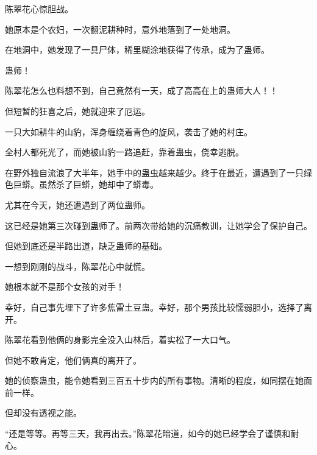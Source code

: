 \begin{this_body}
陈翠花心惊胆战。

她原本是个农妇，一次翻泥耕种时，意外地落到了一处地洞。

在地洞中，她发现了一具尸体，稀里糊涂地获得了传承，成为了蛊师。

蛊师！

陈翠花怎么也料想不到，自己竟然有一天，成了高高在上的蛊师大人！！

但短暂的狂喜之后，她就迎来了厄运。

一只大如耕牛的山豹，浑身缠绕着青色的旋风，袭击了她的村庄。

全村人都死光了，而她被山豹一路追赶，靠着蛊虫，侥幸逃脱。

在野外独自流浪了大半年，她手中的蛊虫越来越少。终于在最近，遭遇到了一只绿色巨蟒。虽然杀了巨蟒，她却中了蟒毒。

尤其在今天，她还遭遇到了两位蛊师。

这已经是她第三次碰到蛊师了。前两次带给她的沉痛教训，让她学会了保护自己。

但她到底还是半路出道，缺乏蛊师的基础。

一想到刚刚的战斗，陈翠花心中就慌。

她根本就不是那个女孩的对手！

幸好，自己事先埋下了许多焦雷土豆蛊。幸好，那个男孩比较懦弱胆小，选择了离开。

陈翠花看到他俩的身影完全没入山林后，着实松了一大口气。

但她不敢肯定，他们俩真的离开了。

她的侦察蛊虫，能令她看到三百五十步内的所有事物。清晰的程度，如同摆在她面前一样。

但却没有透视之能。

“还是等等。再等三天，我再出去。”陈翠花暗道，如今的她已经学会了谨慎和耐心。

\end{this_body}

